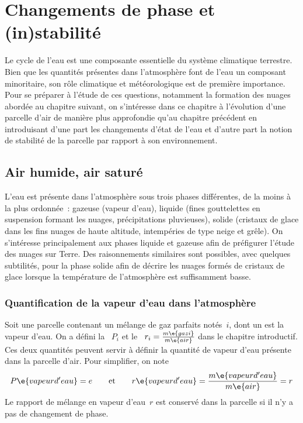 \chapter{Changements de phase et (in)stabilité}


\bk
Le cycle de l'eau est une composante essentielle du système climatique terrestre. Bien que les quantités présentes dans l'atmosphère font de l'eau un composant minoritaire, son rôle climatique et météorologique est de première importance. Pour se préparer à l'étude de ces questions, notamment la formation des nuages abordée au chapitre suivant, on s'intéresse dans ce chapitre à l'évolution d'une parcelle d'air de manière plus approfondie qu'au chapitre précédent en introduisant d'une part les changements d'état de l'eau et d'autre part la notion de stabilité de la parcelle par rapport à son environnement.

\mk
\section{Air humide, air saturé}

\sk
L'eau est présente dans l'atmosphère sous trois phases différentes, de la moins à la plus ordonnée~: gazeuse (vapeur d'eau), liquide (fines gouttelettes en suspension formant les nuages, précipitations pluvieuses), solide (cristaux de glace dans les fins nuages de haute altitude, intempéries de type neige et grêle). On s'intéresse principalement aux phases liquide et gazeuse afin de préfigurer l'étude des nuages sur Terre. Des raisonnements similaires sont possibles, avec quelques subtilités, pour la phase solide afin de décrire les nuages formés de cristaux de glace lorsque la température de l'atmosphère est suffisamment basse.

\sk
\subsection{Quantification de la vapeur d'eau dans l'atmosphère}\label{rappmel}

\sk
Soit une parcelle contenant un mélange de gaz parfaits notés~$i$, dont un est la vapeur d'eau. On a défini la ~$P_i$ et le ~$r_i = \frac{m\e{gaz i}}{m\e{air}}$ dans le chapitre introductif. Ces deux quantités peuvent servir à définir la quantité de vapeur d'eau présente dans la parcelle d'air. Pour simplifier, on note
\[ P\e{vapeur d'eau} = e \qquad \text{et} \qquad r\e{vapeur d'eau} = \frac{m\e{vapeur d'eau}}{m\e{air}} = r \] 
Le rapport de mélange en vapeur d'eau~$r$ est conservé dans la parcelle si il n'y a pas de changement de phase.

